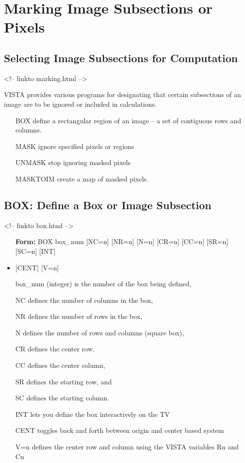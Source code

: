 \chapter{Marking Image Subsections or Pixels}

\section{Selecting Image Subsections for Computation}
\begin{rawhtml}
<!-- linkto marking.html -->
\end{rawhtml}

%
%

VISTA provides various programs for designating that certain subsections of
an image are to be ignored or included in calculations.
\begin{itemize}
  \item[BOX\hfill]{define a rectangular region of an image --
       a set of contiguous rows and columns.}
  \item[MASK\hfill]{ignore specified pixels or regions}
  \item[UNMASK\hfill]{stop ignoring masked pixels}
  \item[MASKTOIM\hfill]{create a map of masked pixels.}
\end{itemize}

\section{BOX: Define a Box or Image Subsection}
\begin{rawhtml}
<!-- linkto box.html -->
\end{rawhtml}
\begin{itemize}
  \item[\textbf{Form:}  BOX box\_num {[NC=n]} {[NR=n]} {[N=n]} {[CR=n]} 
       {[CC=n]} {[SR=n]} {[SC=n]} {[INT]}\hfill]{}
  \item{   {[CENT]} {[V=n]}}
  \item[box\_num]{(integer) is the number of the box being defined,}
  \item[NC]{defines the number of columns in the box,}
  \item[NR]{defines the number of rows in the box,}
  \item[N  ]{ defines the number of rows and columns (square box),}
  \item[CR]{defines the center row,}
  \item[CC]{defines the center column,}
  \item[SR]{defines the starting row, and}
  \item[SC]{defines the starting column.}
  \item[INT]{lets you define the box interactively on the TV}
  \item[CENT]{toggles back and forth between origin and center based system}
  \item[V=n  ]{defines the center row and column using the
       VISTA variables Rn and Cn}
\end{itemize}

